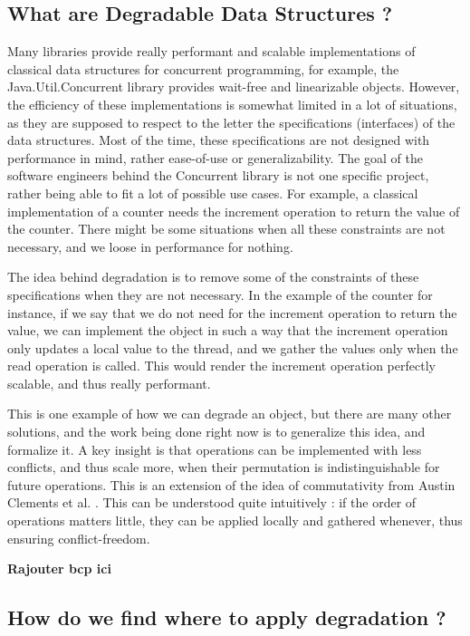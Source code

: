 \documentclass[conference]{IEEEtran}
\begin{document}
\subsection{What are Degradable Data Structures ?}
Many libraries provide really performant and scalable implementations of classical data structures for concurrent programming, for example, the Java.Util.Concurrent library \cite{java_concurrent} provides wait-free and linearizable objects. However, the efficiency of these implementations is somewhat limited in a lot of situations, as they are supposed to respect to the letter the specifications (interfaces) of the data structures. Most of the time, these specifications are not designed with performance in mind, rather ease-of-use or generalizability. The goal of the software engineers behind the Concurrent library is not one specific project, rather being able to fit a lot of possible use cases. For example, a classical implementation of a counter needs the increment operation to return the value of the counter. There might be some situations when all these constraints are not necessary, and we loose in performance for nothing.

The idea behind degradation is to remove some of the constraints of these specifications when they are not necessary. In the example of the counter for instance, if we say that we do not need for the increment operation to return the value, we can implement the object in such a way that the increment operation only updates a local value to the thread, and we gather the values only when the read operation is called. This would render the increment operation perfectly scalable, and thus really performant.

This is one example of how we can degrade an object, but there are many other solutions, and the work being done right now is to generalize this idea, and formalize it. A key insight is that operations can be implemented with less conflicts, and thus scale more, when their permutation is indistinguishable for future operations. This is an extension of the idea of commutativity from Austin Clements et al. \cite{scalable}. This can be understood quite intuitively : if the order of operations matters little, they can be applied locally and gathered whenever, thus ensuring conflict-freedom.

\textbf{Rajouter bcp ici}


\subsection{How do we find where to apply degradation ?}
\bigbreak
\bigbreak
\end{document}
